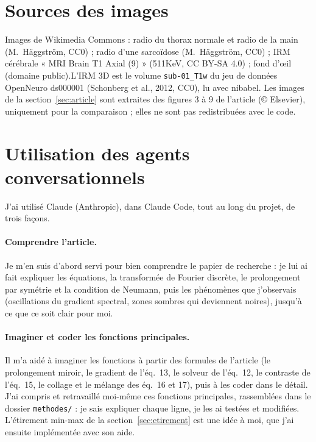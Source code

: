\documentclass[11pt,a4paper]{article}
\begin{document}
\section{Sources des images}

Images de Wikimedia Commons : radio du thorax normale et radio de la main (M.~Häggström, CC0) ; radio d'une
sarcoïdose (M.~Häggström, CC0) ; IRM cérébrale « MRI Brain T1 Axial (9) » (511KeV, CC BY-SA 4.0) ; fond
d'œil (domaine public).L'IRM 3D est le volume \texttt{sub-01\_T1w} du jeu de données OpenNeuro ds000001 (Schonberg et al.,
2012, CC0), lu avec nibabel. Les images de la section~\ref{sec:article} sont extraites des figures 3 à 9
de l'article \cite{morel} (© Elsevier), uniquement pour la comparaison ; elles ne sont pas redistribuées
avec le code.

\section{Utilisation des agents conversationnels}\label{sec:agents}

J'ai utilisé Claude (Anthropic), dans Claude Code, tout au long du projet, de trois façons.

\paragraph{Comprendre l'article.} Je m'en suis d'abord servi pour bien comprendre le papier de recherche :
je lui ai fait expliquer les équations, la transformée de Fourier discrète, le prolongement par symétrie
et la condition de Neumann, puis les phénomènes que j'observais (oscillations du gradient spectral,
zones sombres qui deviennent noires), jusqu'à ce que ce soit clair pour moi.

\paragraph{Imaginer et coder les fonctions principales.} Il m'a aidé à imaginer les fonctions à partir
des formules de l'article (le prolongement miroir, le gradient de l'éq.~13, le solveur de l'éq.~12, le
contraste de l'éq.~15, le collage et le mélange des éq.~16 et 17), puis à les coder dans le détail.
J'ai compris et retravaillé moi-même ces fonctions principales, rassemblées dans le dossier
\texttt{methodes/} : je sais expliquer chaque ligne, je les ai testées et modifiées. L'étirement min-max
de la section~\ref{sec:etirement} est une idée à moi, que j'ai ensuite implémentée avec son aide.
\end{document}
